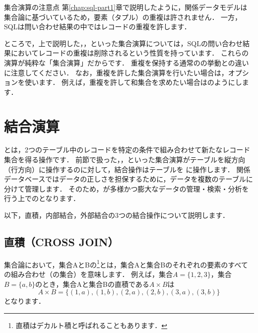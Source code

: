 \begin{warningbox}{集合演算の注意点}
第\ref{chap:sql-part1}章で説明したように，関係データモデルは集合論に基づいているため，要素（タプル）の重複は許されません．
一方，SQLは問い合わせ結果の中ではレコードの重複を許します．

ところで，上で説明した，，といった集合演算については，SQLの問い合わせ結果においてレコードの重複は削除されるという性質を持っています．
これらの演算が純粋な「集合演算」だからです．
重複を保持する通常のの挙動との違いに注意してください．
なお，重複を許した集合演算を行いたい場合は，オプションを使います．
例えば，重複を許して和集合を求めたい場合はのようにします．
\end{warningbox}

\section{結合演算}\label{sec:join}
 とは，2つのテーブル中のレコードを特定の条件で組み合わせて新たなレコード集合を得る操作です．
前節で扱った，，といった集合演算がテーブルを縦方向（行方向）に操作するのに対して，結合操作はテーブルを に操作します．
関係データベースではデータの正しさを担保するために，データを複数のテーブルに分けて管理します．
そのため，が多様かつ膨大なデータの管理・検索・分析を行う上でのとなります．

以下，直積，内部結合，外部結合の3つの結合操作について説明します．


\subsection{直積（CROSS JOIN）}
集合論において，集合AとBの\footnote{直積はデカルト積と呼ばれることもあります．}とは，集合Aと集合Bのそれぞれの要素のすべての組み合わせ（の集合）を意味します．
例えば，集合$A=\{1, 2, 3\}$，集合$B=\{a, b\}$のとき，集合Aと集合Bの直積である$A \times B$は
\begin{equation}
A \times B = \{(1, a), (1, b), (2, a), (2, b), (3, a), (3, b)\}
\end{equation}
となります．

